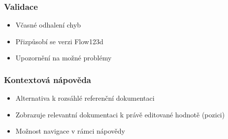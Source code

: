 \begin{frame}
	\frametitle{Validace}
	\begin{itemize}[<+->]
	\item Včasné odhalení chyb
	\item Přizpůsobí se verzi Flow123d
	\item Upozornění na možné problémy
	\end{itemize}
\end{frame}


\begin{frame}
	\frametitle{Kontextová nápověda}
	\begin{itemize}[<+->]
	\item Alternativa k rozsáhlé referenční dokumentaci
	\item Zobrazuje relevantní dokumentaci k právě editované hodnotě (pozici)
	\item Možnost navigace v rámci nápovědy
	\end{itemize}
\end{frame}

